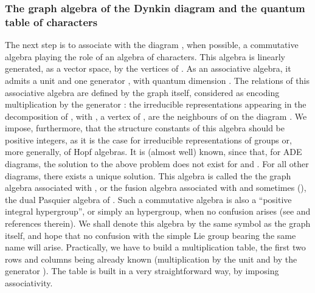 \documentclass[a4paper,11pt]{article}
\begin{document}
\subsubsection{The graph algebra of the Dynkin diagram and the quantum table of
characters}

The next step is to associate with the diagram \coordHE{}, when possible, a
commutative algebra playing the role of an algebra of characters.
This algebra is linearly generated, as a vector space, by the vertices
\coordHE{} of \coordHE{}. As an  associative algebra, it admits a unit \coordHE{} and
one generator \coordHE{}, with quantum dimension \coordHE{}. The
relations of this associative algebra
are defined by the graph \coordHE{} itself, considered as encoding
multiplication by the generator \coordHE{}: the irreducible representations
appearing in the decomposition of \myHighlight{$\sigma_1 \sigma$}\coordHE{}, with \myHighlight{$\sigma$}\coordHE{}, a
vertex of \coordHE{}, are the neighbours of
\myHighlight{$\sigma$}\coordHE{} on the diagram \coordHE{}.
We impose, furthermore, that the structure constants of this algebra
should be positive integers, as it is the case for irreducible
representations of
groups or, more generally, of Hopf algebras.
It is (almost well) known, since  \cite{Pasquier:alg} that, for
ADE diagrams, the solution to the above problem does not exist for
       \coordHE{} and \coordHE{}. For all other \coordHE{} diagrams, there exists a
unique solution. This algebra is called the the graph algebra
associated with \coordHE{}, or the fusion algebra associated
with \coordHE{} and sometimes  (\cite{Zuber:Bariloche}),
the dual Pasquier algebra of \coordHE{}.
Such a commutative algebra is also  a ``positive integral hypergroup'',
or simply an hypergroup, when no confusion arises (see \cite{hypergroups} and
references therein).
We shall denote this algebra by the same symbol as the graph itself,
and hope that no confusion with the simple Lie group bearing the same
name will arise.
Practically, we have to build a multiplication table,
the first two rows and columns being already known (multiplication by
the unit \coordHE{} and
by the generator \coordHE{}).
The table is  built in a very straightforward way, by imposing associativity.
\end{document}
